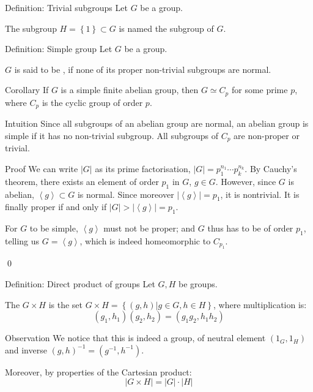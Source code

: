 \documentclass[a4paper]{article}
\begin{document}
\begin{parag}{Definition: Trivial subgroups}
    Let $G$ be a group.

    The subgroup $H = \left\{1\right\} \subset G$ is named the  subgroup of $G$.
\end{parag}

\begin{parag}{Definition: Simple group}
    Let $G$ be a group.

    $G$ is said to be , if none of its proper non-trivial subgroups are normal.
\end{parag}

\begin{parag}{Corollary}
    If $G$ is a simple finite abelian group, then $G \simeq C_p$ for some prime $p$, where $C_p$ is the cyclic group of order $p$.

    \begin{subparag}{Intuition}
        Since all subgroups of an abelian group are normal, an abelian group is simple if it has no non-trivial subgroup. All subgroups of $C_p$ are non-proper or trivial.
    \end{subparag}

    \begin{subparag}{Proof}
        We can write $\left|G\right|$ as its prime factorisation, $\left|G\right| = p_1^{n_1} \cdots p_k^{n_k}$. By Cauchy's theorem, there exists an element of order $p_1$ in $G$, $g \in G$. However, since $G$ is abelian, $\left\langle g \right\rangle \subset G$ is normal. Since moreover $\left|\left\langle g \right\rangle\right| = p_1$, it is nontrivial. It is finally proper if and only if $\left|G\right| > \left|\left\langle g \right\rangle\right| = p_1$.

        For $G$ to be simple, $\left\langle g \right\rangle$ must not be proper; and $G$ thus has to be of order $p_1$, telling us $G = \left\langle g \right\rangle$, which is indeed homeomorphic to $C_{p_1}$.

        \qed
    \end{subparag}
\end{parag}

\begin{parag}{Definition: Direct product of groups}
    Let $G, H$ be groups.

    The  $G \times H$ is the set $G \times H = \left\{\left(g, h\right) | g \in G, h \in H\right\}$, where multiplication is: 
    \[\left(g_1, h_1\right)\left(g_2, h_2\right) = \left(g_1 g_2, h_1 h_2\right)\]
    
    \begin{subparag}{Observation}
        We notice that this is indeed a group, of neutral element $\left(1_G, 1_H\right)$ and inverse $\left(g, h\right)^{-1} = \left(g^{-1}, h^{-1}\right)$.

        Moreover, by properties of the Cartesian product: 
        \[\left|G \times H\right| = \left|G\right|\cdot \left|H\right|\]
    \end{subparag}
\end{parag}
\end{document}
